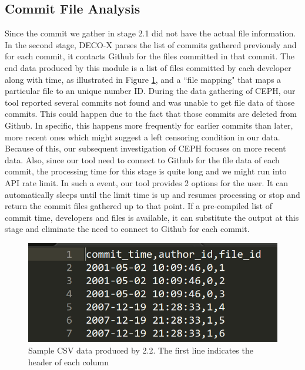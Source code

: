 \documentclass{article}
\begin{document}
\subsection{Commit File Analysis}
Since the commit we gather in stage 2.1 did not have the actual file information. In the second stage, DECO-X parses the list of commits gathered previously and for each commit, it contacts Github for the files committed in that commit. The end data produced by this module is a list of files committed by each developer along with time, as illustrated in Figure \ref{fig:data22}, and a ``file mapping" that maps a particular file to an unique number ID. During the data gathering of CEPH, our tool reported several commits not found and was unable to get file data of those commits. This could happen due to the fact that those commits are deleted from Github. In specific, this happens more frequently for earlier commits than later, more recent ones which might suggest a left censoring condition in our data. Because of this, our subsequent investigation of CEPH focuses on more recent data. Also, since our tool need to connect to Github for the file data of each commit, the processing time for this stage is quite long and we might run into API rate limit. In such a event, our tool provides 2 options for the user. It can automatically sleeps until the limit time is up and resumes processing or stop and return the commit files gathered up to that point. If a pre-compiled list of commit time, developers and files is available, it can substitute the output at this stage and eliminate the need to connect to Github for each commit.

\begin{figure}[h!]
\centering
\includegraphics[scale=0.5]{images/datasample.png}
\caption{Sample CSV data produced by 2.2. The first line indicates the header of each column}
\label{fig:data22}
\end{figure}
\end{document}
